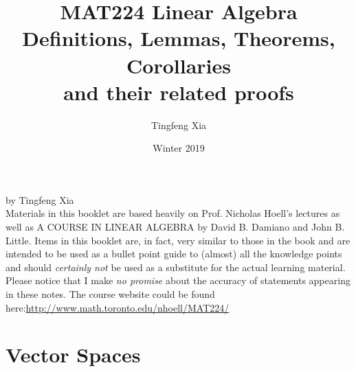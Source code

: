 \documentclass[oneside, 12pt]{book}
\title{%
  \textbf{MAT224 Linear Algebra}\\
  \large Definitions, Lemmas, Theorems, Corollaries \\
    and their related proofs}
\author{Tingfeng Xia}
\date{Winter 2019}
\newcommand{\tit}[1]{\textit{#1}}
\begin{document}
\frontmatter
\maketitle
\newpage %
\mbox{}
\vfill
\noindent by Tingfeng Xia \\


\noindent Materials in this booklet are based heavily on Prof. Nicholas Hoell's lectures as well as 
A COURSE IN LINEAR ALGEBRA by David B. Damiano and John B. Little.\newline\newline
Items in this booklet are, in fact, very similar to those in the book and are intended to be used as a bullet point guide to (almost) all the knowledge points and should \tit{certainly not} be used as a substitute for the actual learning material. Please notice that I make\tit{ no promise} about the accuracy of statements appearing in these notes.\newline\newline
The course website could be found here:\newline \url{http://www.math.toronto.edu/nhoell/MAT224/}
\newpage

\tableofcontents

\mainmatter

\chapter{Vector Spaces}
\end{document}

